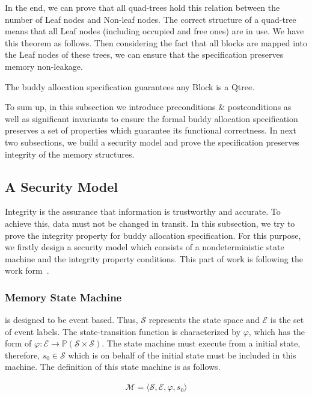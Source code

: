 In the end, we can prove that all quad-trees hold this relation between the number of Leaf nodes and Non-leaf nodes. The correct structure of a quad-tree means that all Leaf nodes (including occupied and free ones) are in use. We have this theorem as follows. Then considering the fact that all blocks are mapped into the Leaf nodes of these trees, we can ensure that the specification preserves memory non-leakage.

\begin{theorem}
The buddy allocation specification guarantees any Block is a Qtree.
\end{theorem}

To sum up, in this subsection we introduce preconditions $\&$ postconditions as well as significant invariants to ensure the formal buddy allocation specification preserves a set of properties which guarantee its functional correctness. In next two subsections, we build a security model and prove the specification preserves integrity of the memory structures.

\subsection{A Security Model}\label{sec:securitymodel}
Integrity is the assurance that information is trustworthy and accurate. To achieve this, data must not be changed in transit. In this subsection, we try to prove the integrity property for buddy allocation specification. For this purpose, we firstly design a security model which consists of a nondeterministic state machine and the integrity property conditions. This part of work is following the work form~\cite{reg_securitymodel}.

\subsubsection{Memory State Machine} is designed to be event based. Thus, $\mathcal{S}$ represents the state space and $\mathcal{E}$ is the set of event labels. The state-transition function is characterized by $\varphi$, which has the form of $\varphi: \mathcal{E} \rightarrow \mathbb{P}(\mathcal{S} \times \mathcal{S})$. The state machine must execute from a initial state, therefore, $s_0 \in \mathcal{S}$ which is on behalf of the initial state must be included in this machine. The definition of this state machine is as follows.

\begin{definition} 
\vspace{-7pt}
\end{definition}	
{\footnotesize
\begin{align*}
\mathcal{M} = \langle \mathcal{S}, \mathcal{E}, \varphi, s_0 \rangle
\end{align*}
}
\vspace{-12pt}

